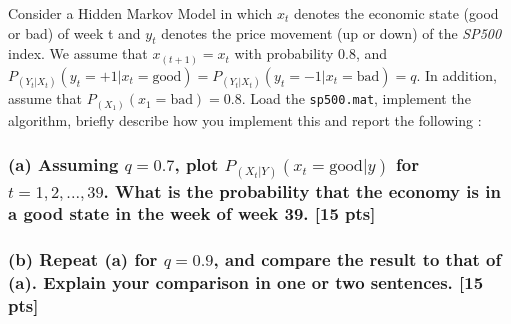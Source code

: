\documentclass[twoside,11pt]{article}\usepackage{amsmath,amsfonts,amsthm,fullpage}
\begin{document}
Consider a Hidden Markov Model in which $x_t$ denotes the economic
state (good or bad) of week t and $y_t$ denotes the price movement
(up or down) of the \emph{SP500} index. We assume that
$x_{(t+1)}=x_t$ with probability 0.8, and
$P_{(Y_t|X_t)}(y_t=+1|x_t=\text{good}) =
P_{(Y_t|X_t)}(y_t=-1|x_t=\text{bad}) = q.$ In addition, assume that
$P_{(X_1)}(x_1=\text{bad}) = 0.8$. Load the \texttt{sp500.mat},
implement the algorithm, briefly describe how you implement this and
report the following :

\subsubsection*{(a) Assuming $q = 0.7$, plot $P_{(X_t|Y)}(x_t = \text{good}|y)$ for $t = 1,2,...,39$. What is the probability that the economy is in a good state in the week of week 39. [15 pts]}

\subsubsection*{(b) Repeat (a) for $q = 0.9$, and compare the result to that of (a). Explain your comparison in one or two sentences. [15 pts]}
\end{document}

